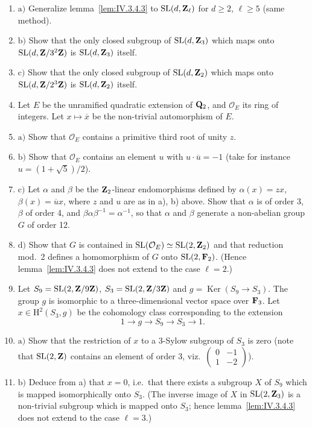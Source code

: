 \begin{exercises}
\begin{enumerate}
\item $\mathrm{a)}$ Generalize lemma~\ref{lem:IV.3.4.3} to $\mathrm{SL}(d,\mathbf{Z}_\ell)$ for $d \geq 2$, $\ell \geq 5$ (same method).
\item $\mathrm{b)}$ Show that the only closed subgroup of $\mathrm{SL}(d,\mathbf{Z}_3)$ which maps onto $\mathrm{SL}(d,\mathbf{Z}/3^2\mathbf{Z})$ is $\mathrm{SL}(d,\mathbf{Z}_3)$ itself.
\item $\mathrm{c)}$ Show that the only closed subgroup of $\mathrm{SL}(d,\mathbf{Z}_2)$ which maps onto $\mathrm{SL}(d,\mathbf{Z}/2^3\mathbf{Z})$ is $\mathrm{SL}(d,\mathbf{Z}_2)$ itself.
\item Let $E$ be the unramified quadratic extension of $\mathbf{Q}_2$, and $\mathcal{O}_E$ its ring of integers. Let $x \mapsto \overline{x}$ be the non-trivial automorphism of $E$.
\item $\mathrm{a)}$ Show that $\mathcal{O}_E$ contains a primitive third root of unity $z$.
\item $\mathrm{b)}$ Show that $\mathcal{O}_E$ contains an element $u$ with $u \cdot \overline{u} = -1$ (take for instance $u = (1+\sqrt{5})/2$).
\item $\mathrm{c)}$ Let $\alpha$ and $\beta$ be the $\mathbf{Z}_2$-linear endomorphisms defined by $\alpha(x) = zx$, $\beta(x) = \overline{u}x$, where $z$ and $u$ are as in a), b) above. Show that $\alpha$ is of order 3, $\beta$ of order 4, and $\beta \alpha \beta^{-1} = \alpha^{-1}$, so that $\alpha$ and $\beta$ generate a non-abelian group $G$ of order 12.
\item $\mathrm{d)}$ Show that $G$ is contained in $\mathrm{SL}(\mathcal{O}_E) \simeq \mathrm{SL}(2,\mathbf{Z}_2)$ and that reduction mod.\ 2 defines a homomorphism of $G$ onto $\mathrm{SL}(2,\mathbf{F}_2)$. (Hence lemma~\ref{lem:IV.3.4.3} does not extend to the case $\ell = 2$.)
\item Let $S_9 = \mathrm{SL}(2,\mathbf{Z}/9\mathbf{Z})$, $S_3 = \mathrm{SL}(2,\mathbf{Z}/3\mathbf{Z})$ and $g = \operatorname{Ker}(S_9 \longrightarrow S_3)$. The group $g$ is isomorphic to a three-dimensional vector space over $\mathbf{F}_3$. Let $x \in \mathrm{H}^2(S_3, g)$ be the cohomology class corresponding to the extension
\[
  1 \longrightarrow g \longrightarrow S_9 \longrightarrow S_3 \longrightarrow 1.
\]
\item $\mathrm{a)}$ Show that the restriction of $x$ to a 3-Sylow subgroup of $S_3$ is zero (note that $\mathrm{SL}(2,\mathbf{Z})$ contains an element of order 3, viz.\ $\begin{pmatrix} 0 & -1 \\ 1 & -2 \end{pmatrix}$).
\item $\mathrm{b)}$ Deduce from a) that $x = 0$, i.e.\ that there exists a subgroup $X$ of $S_9$ which is mapped isomorphically onto $S_3$. (The inverse image of $X$ in $\mathrm{SL}(2,\mathbf{Z}_3)$ is a non-trivial subgroup which is mapped onto $S_3$; hence lemma~\ref{lem:IV.3.4.3} does not extend to the case $\ell = 3$.)
\end{enumerate}
\end{exercises}

